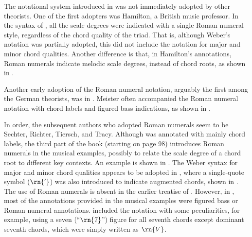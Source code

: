 


The notational system introduced in
\textcite{weber1817versuch} was not immediately adopted by
other theorists. One of the first adopters was Hamilton, a
British music professor. In the syntax of
\textcite{hamilton1840catechism}, all the scale degrees were
indicated with a single Roman numeral style, regardless of
the chord quality of the triad. That is, although Weber's
notation was partially adopted, this did not include the
notation for major and minor chord qualities. Another
difference is that, in Hamilton's annotations, Roman
numerals indicate melodic scale degrees, instead of chord
roots, as shown in
.

Another early adoption of the Roman numeral notation,
arguably the first among the German theorists, was in
\textcite{meister1852vollstandige}. Meister often
accompanied the Roman numeral notation with chord labels and
figured bass indications, as shown in
.


In order, the subsequent authors who adopted Roman numerals
seem to be Sechter, Richter, Tiersch, and Tracy. Although
\textcite{sechter1853grundsatze} was annotated with mainly
chord labels, the third part of the book (starting on page
98) introduces Roman numerals in the musical examples,
possibly to relate the scale degree of a chord root to
different key contexts. An example is shown in
. The Weber
syntax for major and minor chord qualities appears to be
adopted in \textcite{richter1860lehrbuch}, where a
single-quote symbol ($\rn{'}$) was also introduced to
indicate augmented chords, shown in
. The use of
Roman numerals is absent in the earlier treatise of
\textcite{tiersch1868system}. However,  in
\textcite{tiersch1874elementarbuch}, most of the annotations
provided in the musical examples were figured bass or Roman
numeral annotations. \textcite{tracy1878theory} included the
notation with some peculiarities, for example, using a seven
(``$\rn{7}$'') figure for all seventh chords except dominant
seventh chords, which were simply written as $\rn{V}$.

